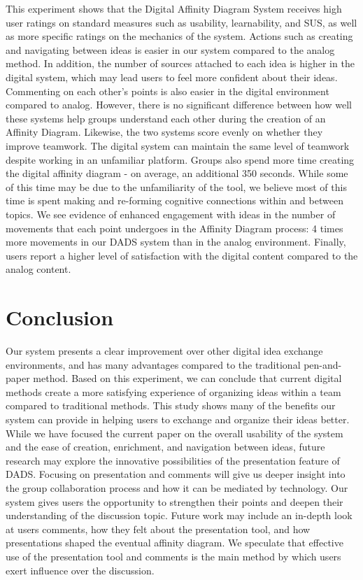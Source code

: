 \documentclass{sigchi}
\begin{document}
This experiment shows that the Digital Affinity Diagram System receives high user ratings on standard measures such as usability, learnability, and SUS, as well as more specific ratings on the mechanics of the system. Actions such as creating and navigating between ideas is easier in our system compared to the analog method. In addition, the number of sources attached to each idea is higher in the digital system, which may lead users to feel more confident about their ideas. Commenting on each other's points is also easier in the digital environment compared to analog. However, there is no significant difference between how well these systems help groups understand each other during the creation of an Affinity Diagram. Likewise, the two systems score evenly on whether they improve teamwork. The digital system can maintain the same level of teamwork despite working in an unfamiliar platform. Groups also spend more time creating the digital affinity diagram - on average, an additional 350 seconds.  While some of this time may be due to the unfamiliarity of the tool, we believe most of this time is spent making and re-forming cognitive connections within and between topics. We see evidence of enhanced engagement with ideas in the number of movements that each point undergoes in the Affinity Diagram process: 4 times more movements in our DADS system than in the analog environment. Finally, users report a higher level of satisfaction with the digital content compared to the analog content. 


\section{Conclusion}
Our system presents a clear improvement over other digital idea exchange environments, and has many advantages compared to the traditional pen-and-paper method. Based on this experiment, we can conclude that current digital methods create a more satisfying experience of organizing ideas within a team compared to traditional methods. This study shows many of the benefits our system can provide in helping users to exchange and organize their ideas better. While we have focused the current paper on the overall usability of the system and the ease of creation, enrichment, and navigation between ideas, future research may explore the innovative possibilities of the presentation feature of DADS. Focusing on presentation and comments will give us deeper insight into the group collaboration process and how it can be mediated by technology. Our system gives users the opportunity to strengthen their points and deepen their understanding of the discussion topic.  Future work may include an in-depth look at users comments, how they felt about the presentation tool, and how presentations shaped the eventual affinity diagram. We speculate that effective use of the presentation tool and comments is the main method by which users exert influence over the discussion.
\end{document}
